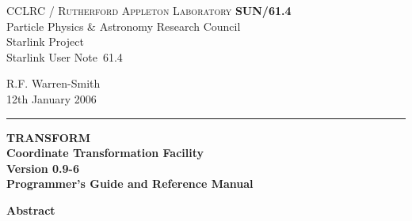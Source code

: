 \documentclass[twoside,11pt]{article}
\newcommand{\stardoccategory}  {Starlink User Note}
\newcommand{\stardocinitials}  {SUN}
\newcommand{\stardocnumber}    {61.4}
\newcommand{\stardocauthors}   {R.F. Warren-Smith}
\newcommand{\stardocdate}      {12th January 2006}
\newcommand{\stardoctitle}     {TRANSFORM \latexhtml{\\[2.5ex]}{\\}
                                Coordinate Transformation Facility}
\newcommand{\stardocversion}   {Version 0.9-6}
\newcommand{\stardocmanual}    {Programmer's Guide and Reference Manual}
\newcommand{\stardocname}{\stardocinitials /\stardocnumber}
\newenvironment{latexonly}{}{}
\newcommand{\latexhtml}[2]{#1}
\renewcommand{\_}{\texttt{\symbol{95}}}
\begin{document}
\thispagestyle{empty}

\begin{latexonly}
   CCLRC / \textsc{Rutherford Appleton Laboratory} \hfill \textbf{\stardocname}\\
   {\large Particle Physics \& Astronomy Research Council}\\
   {\large Starlink Project\\}
   {\large \stardoccategory\ \stardocnumber}
   \begin{flushright}
   \stardocauthors\\
   \stardocdate
   \end{flushright}
   \vspace{-4mm}
   \rule{\textwidth}{0.5mm}
   \vspace{5mm}
   \begin{center}
   {\Huge\textbf{\stardoctitle \\ [2.5ex]}}
   {\LARGE\textbf{\stardocversion \\ [4ex]}}
   {\Huge\textbf{\stardocmanual}}
   \end{center}
   \vspace{5mm}


   \vspace{10mm}
   \begin{center}
      {\Large\textbf{Abstract}}
   \end{center}
\end{latexonly}
\end{document}
